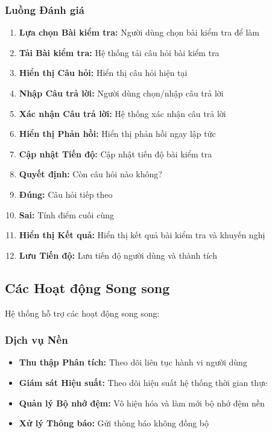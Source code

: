\subsubsection{Luồng Đánh giá}
\begin{enumerate}
    \item \textbf{Lựa chọn Bài kiểm tra:} Người dùng chọn bài kiểm tra để làm
    \item \textbf{Tải Bài kiểm tra:} Hệ thống tải câu hỏi bài kiểm tra
    \item \textbf{Hiển thị Câu hỏi:} Hiển thị câu hỏi hiện tại
    \item \textbf{Nhập Câu trả lời:} Người dùng chọn/nhập câu trả lời
    \item \textbf{Xác nhận Câu trả lời:} Hệ thống xác nhận câu trả lời
    \item \textbf{Hiển thị Phản hồi:} Hiển thị phản hồi ngay lập tức
    \item \textbf{Cập nhật Tiến độ:} Cập nhật tiến độ bài kiểm tra
    \item \textbf{Quyết định:} Còn câu hỏi nào không?
    \item \textbf{Đúng:} Câu hỏi tiếp theo
    \item \textbf{Sai:} Tính điểm cuối cùng
    \item \textbf{Hiển thị Kết quả:} Hiển thị kết quả bài kiểm tra và khuyến nghị
    \item \textbf{Lưu Tiến độ:} Lưu tiến độ người dùng và thành tích
\end{enumerate}

\subsection{Các Hoạt động Song song}

Hệ thống hỗ trợ các hoạt động song song:

\subsubsection{Dịch vụ Nền}
\begin{itemize}
    \item \textbf{Thu thập Phân tích:} Theo dõi liên tục hành vi người dùng
    \item \textbf{Giám sát Hiệu suất:} Theo dõi hiệu suất hệ thống thời gian thực
    \item \textbf{Quản lý Bộ nhớ đệm:} Vô hiệu hóa và làm mới bộ nhớ đệm nền
    \item \textbf{Xử lý Thông báo:} Gửi thông báo không đồng bộ
\end{itemize}

